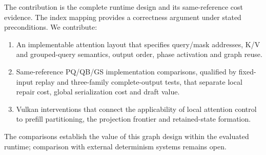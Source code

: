 The contribution is the complete runtime design and its same-reference cost evidence. The index mapping provides a correctness argument under stated preconditions. We contribute:
\begin{enumerate}[label=(\arabic*),topsep=3pt]
\item An implementable attention layout that specifies query/mask addresses, K/V and grouped-query semantics, output order, phase activation and graph reuse.
\item Same-reference PQ/QB/GS implementation comparisons, qualified by fixed-input replay and three-family complete-output tests, that separate local repair cost, global serialization cost and draft value.
\item Vulkan interventions that connect the applicability of local attention control to prefill partitioning, the projection frontier and retained-state formation.
\end{enumerate}
The comparisons establish the value of this graph design within the evaluated runtime; comparison with external determinism systems remains open.

